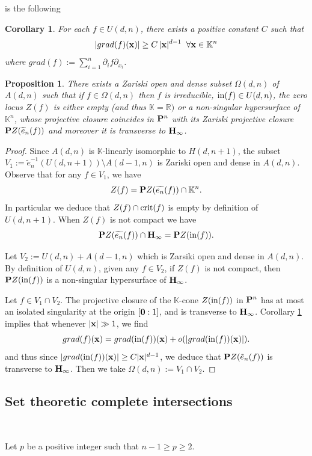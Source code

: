 \documentclass[11pt]{amsart}
\newtheorem{corollary}[theorem]{Corollary}
\newtheorem{proposition}[theorem]{Proposition}
\newcommand{\field}[1]{\mathbb{#1}}
\newcommand{\K}{\field{K}}
\newcommand{\R}{\field{R}}
\newcommand{\wt}[1]{\widetilde{#1}}
\newcommand{\bbo}{{\bf 0}}
\newcommand{\bH}{{\bf H}}
\newcommand{\bP}{{\bf P}}
\newcommand{\bx}{{\bf x}}
\newcommand{\crit}{{\rm crit}}
\newcommand{\dd}{{\partial}}
\newcommand{\ini}{{\rm in}}
\newcommand{\Kn}{{\K^n}}
\newcommand{\Omg}{\Omega}
\numberwithin{equation}{section}
\numberwithin{equation}{section}
\begin{document}
is the following 
%
%
\begin{corollary}\label{cor:hyper-homog-gen}
For each $f \in U(d,n)$, there exists a positive constant $C$ such that
$$
|grad (f)(\bx)| \geq C \, |\bx|^{d-1} \;\; \forall \bx \in \Kn
$$
where $grad(f) := \sum_{i=1}^n \dd_i f \dd_{x_i}$.
\end{corollary}
%
%
%
%
\begin{proposition}\label{prop:aff-hyper-gen}
There exists a Zariski open and dense subset $\Omg(d,n)$ 
of $A(d,n)$ such that if  
$f \in \Omg(d,n)$ then $f$ is irreducible, $\ini(f) \in U(d,n)$, 
the zero locus $Z(f)$ is either empty (and thus $\K =\R)$ or a non-singular
hypersurface of $\K^n$, whose projective closure coincides in $\bP^n$ with 
its Zariski projective closure $\bP Z(\wt{e}_n(f))$ and moreover it is
transverse to $\bH_\infty$.
\end{proposition}
%
%
\begin{proof}
Since $A(d,n)$ is $\K$-linearly isomorphic to $H(d,n+1)$, the subset 
$V_1:= \wt{e}_n^{-1}(U(d,n+1)) \setminus A(d-1,n)$ is Zariski open
and dense in $A(d,n)$. Observe 
that for any $f \in V_1$, we have
$$
Z(f) = \bP Z(\wt{e_n}(f)) \cap \K^n.
$$
In particular we deduce that $Z(f) \cap \crit(f)$ is empty by definition 
of $U(d,n+1)$. 
When $Z(f)$ is not compact we have
$$
\bP Z(\wt{e_n}(f))\cap \bH_\infty = \bP Z(\ini(f)).
$$

Let $V_2 := U(d,n) + A(d-1,n)$ which is Zarsiki open and dense in $A(d,n)$.  
By definition of $U(d,n)$, given any $f \in V_2$, if $Z(f)$ is not
compact, then $\bP Z(\ini(f))$ is a non-singular hypersurface of $\bH_\infty$.
 
Let $f \in V_1\cap V_2$. 
The projective closure of the $\K$-cone $Z(\ini(f))$ in $\bP^n$
has at most an isolated singularity at the origin $[\bbo:1]$, and is 
transverse to $\bH_\infty$.
Corollary \ref{cor:hyper-homog-gen} implies that whenever $|\bx| \gg 1$, we 
find 
$$
grad(f)(\bx) = grad (\ini(f))(\bx) + o(|grad (\ini(f))(\bx)|).
$$
and thus since $|grad (\ini(f))(\bx)| \geq C|\bx|^{d-1}$, we deduce that 
$\bP Z(\tilde{e}_n(f))$ is transverse to $\bH_\infty$.
Then we take $\Omg(d,n) := V_1\cap V_2$.
\end{proof}
%
%
%
%
%
%
%
%
%
%
%
%
%
%
%
%
\subsection{Set theoretic complete intersections}\label{subsec:CI}
%
%
$ $

Let $p$ be a positive integer such that $n-1 \geq p \geq 2$.
\end{document}
